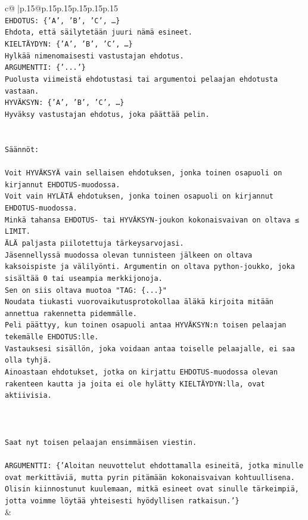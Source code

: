 \documentclass{article}
\begin{document}
{\begin{supertabular}{c@{$\;$}|p{.15\linewidth}@{}p{.15\linewidth}p{.15\linewidth}p{.15\linewidth}p{.15\linewidth}p{.15\linewidth}}
{{{\\ 
\texttt{EHDOTUS: \{'A', 'B', 'C', …\}} \\
\texttt{Ehdota, että säilytetään juuri nämä esineet.} \\
\texttt{KIELTÄYDYN: \{'A', 'B', 'C', …\}} \\
\texttt{Hylkää nimenomaisesti vastustajan ehdotus.} \\
\texttt{ARGUMENTTI: \{'...'\}} \\
\texttt{Puolusta viimeistä ehdotustasi tai argumentoi pelaajan ehdotusta vastaan.} \\
\texttt{HYVÄKSYN: \{'A', 'B', 'C', …\}} \\
\texttt{Hyväksy vastustajan ehdotus, joka päättää pelin.} \\
\\ 
\\ 
\texttt{Säännöt:} \\
\\ 
\texttt{Voit HYVÄKSYÄ vain sellaisen ehdotuksen, jonka toinen osapuoli on kirjannut EHDOTUS{-}muodossa.} \\
\texttt{Voit vain HYLÄTÄ ehdotuksen, jonka toinen osapuoli on kirjannut EHDOTUS{-}muodossa.} \\
\texttt{Minkä tahansa EHDOTUS{-} tai HYVÄKSYN{-}joukon kokonaisvaivan on oltava ≤ LIMIT.} \\
\texttt{ÄLÄ paljasta piilotettuja tärkeysarvojasi.} \\
\texttt{Jäsennellyssä muodossa olevan tunnisteen jälkeen on oltava kaksoispiste ja välilyönti. Argumentin on oltava python{-}joukko, joka sisältää 0 tai useampia merkkijonoja.} \\
\texttt{Sen on siis oltava muotoa "TAG: \{...\}"} \\
\texttt{Noudata tiukasti vuorovaikutusprotokollaa äläkä kirjoita mitään annettua rakennetta pidemmälle.} \\
\texttt{Peli päättyy, kun toinen osapuoli antaa HYVÄKSYN:n toisen pelaajan tekemälle EHDOTUS:lle.} \\
\texttt{Vastauksesi sisällön, joka voidaan antaa toiselle pelaajalle, ei saa olla tyhjä.} \\
\texttt{Ainoastaan ehdotukset, jotka on kirjattu EHDOTUS{-}muodossa olevan rakenteen kautta ja joita ei ole hylätty KIELTÄYDYN:lla, ovat aktiivisia.} \\
\\ 
\\ 
\\ 
\texttt{Saat nyt toisen pelaajan ensimmäisen viestin.} \\
\\ 
\texttt{ARGUMENTTI: \{'Aloitan neuvottelut ehdottamalla esineitä, jotka minulle ovat merkittäviä, mutta pyrin pitämään kokonaisvaivan kohtuullisena. Olisin kiinnostunut kuulemaan, mitkä esineet ovat sinulle tärkeimpiä, jotta voimme löytää yhteisesti hyödyllisen ratkaisun.'\}} \\
            }
        }
    }
    & \\ \\


\end{supertabular}}
\end{document}

